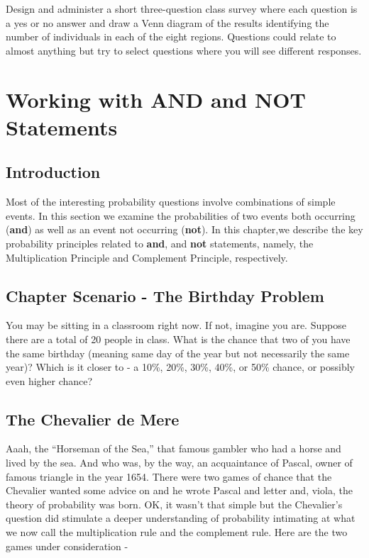 \documentclass[]{book}
\theoremstyle{definition}
\theoremstyle{definition}
\theoremstyle{definition}
\theoremstyle{remark}
\begin{document}
Design and administer a short three-question class survey where each
question is a yes or no answer and draw a Venn diagram of the results
identifying the number of individuals in each of the eight regions.
Questions could relate to almost anything but try to select questions
where you will see different responses.

\chapter{Working with AND and NOT
Statements}\label{working_with_and_and_not_statements}

\section{Introduction}\label{introduction}

Most of the interesting probability questions involve combinations of
simple events. In this section we examine the probabilities of two
events both occurring (\textbf{and}) as well as an event not occurring
(\textbf{not}). In this chapter,we describe the key probability
principles related to \textbf{and}, and \textbf{not} statements, namely,
the Multiplication Principle and Complement Principle, respectively.

\section{Chapter Scenario - The Birthday
Problem}\label{chapter_scenario_birthday_problem}

You may be sitting in a classroom right now. If not, imagine you are.
Suppose there are a total of 20 people in class. What is the chance that
two of you have the same birthday (meaning same day of the year but not
necessarily the same year)? Which is it closer to - a 10\%, 20\%, 30\%,
40\%, or 50\% chance, or possibly even higher chance?

\section{The Chevalier de Mere}\label{the-chevalier-de-mere}

Aaah, the ``Horseman of the Sea,'' that famous gambler who had a horse
and lived by the sea. And who was, by the way, an acquaintance of
Pascal, owner of famous triangle in the year 1654. There were two games
of chance that the Chevalier wanted some advice on and he wrote Pascal
and letter and, viola, the theory of probability was born. OK, it wasn't
that simple but the Chevalier's question did stimulate a deeper
understanding of probability intimating at what we now call the
multiplication rule and the complement rule. Here are the two games
under consideration -
\end{document}
